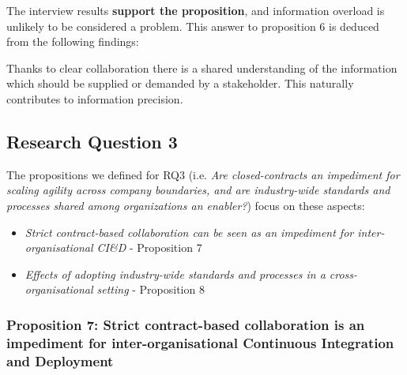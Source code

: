 %

The interview results {\bf support the proposition}, and information overload is unlikely to be considered a problem. This answer to proposition 6 is deduced from the following findings:

 Thanks to clear collaboration there is a shared understanding of the information which should be supplied or demanded by a stakeholder. This naturally contributes to information precision.

\subsection{Research Question 3}\label{sec:ResearchQuestion3}

The propositions we defined for  
RQ3 (i.e. {\em Are closed-contracts an impediment for scaling agility across company boundaries, and 
are industry-wide standards and processes shared among organizations an enabler?}) focus on these aspects:

\begin{itemize}
\item {\em Strict contract-based collaboration can be seen as an impediment for inter-organisational CI\&D}  - Proposition 7 
\item {\em Effects of adopting industry-wide standards and processes in a cross-organisational setting} - Proposition 8 
\end{itemize}

\vspace{.2cm}
\subsubsection{Proposition 7: Strict contract-based collaboration is an impediment for inter-organisational Continuous Integration and Deployment}

